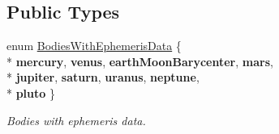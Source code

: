 \subsection*{Public Types}
\begin{DoxyCompactItemize}
\item 
enum \hyperlink{classtudat_1_1ephemerides_1_1ApproximatePlanetPositionsBase_aa698885dcabac2815a6205d5502724d2}{Bodies\+With\+Ephemeris\+Data} \{ \\*
{\bfseries mercury}, 
{\bfseries venus}, 
{\bfseries earth\+Moon\+Barycenter}, 
{\bfseries mars}, 
\\*
{\bfseries jupiter}, 
{\bfseries saturn}, 
{\bfseries uranus}, 
{\bfseries neptune}, 
\\*
{\bfseries pluto}
 \}\hypertarget{classtudat_1_1ephemerides_1_1ApproximatePlanetPositionsBase_aa698885dcabac2815a6205d5502724d2}{}\label{classtudat_1_1ephemerides_1_1ApproximatePlanetPositionsBase_aa698885dcabac2815a6205d5502724d2}
\begin{DoxyCompactList}\small\item\em Bodies with ephemeris data. \end{DoxyCompactList}
\end{DoxyCompactItemize}

